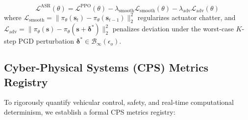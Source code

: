 \documentclass[conference]{IEEEtran}
\begin{document}
\begin{enumerate}
    \begin{equation}
        \mathcal{L}^{\text{ASR}}(\theta) = \mathcal{L}^{\text{PPO}}(\theta) - \lambda_{\text{smooth}} \mathcal{L}_{\text{smooth}}(\theta) - \lambda_{\text{adv}} \mathcal{L}_{\text{adv}}(\theta)
    \end{equation}
    where $\mathcal{L}_{\text{smooth}} = \|\pi_\theta(\mathbf{s}_t) - \pi_\theta(\mathbf{s}_{t-1})\|_2^2$ regularizes actuator chatter, and $\mathcal{L}_{\text{adv}} = \|\pi_\theta(\mathbf{s}) - \pi_\theta(\mathbf{s} + \boldsymbol{\delta}^*)\|_2^2$ penalizes deviation under the worst-case $K$-step PGD perturbation $\boldsymbol{\delta}^* \in \mathcal{B}_\infty(\epsilon_o)$.
\end{enumerate}

\subsection{Cyber-Physical Systems (CPS) Metrics Registry}
To rigorously quantify vehicular control, safety, and real-time computational determinism, we establish a formal CPS metrics registry:
\end{document}
